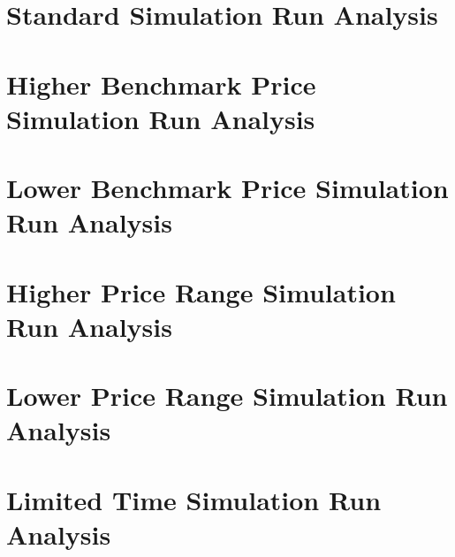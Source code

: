 \newpage
\section{Standard Simulation Run Analysis}
\label{sec:data:standard}


\newpage
\section{Higher Benchmark Price Simulation Run Analysis}
\label{sec:data:higher_benchmark}


\newpage
\section{Lower Benchmark Price Simulation Run Analysis}
\label{sec:data:lower_benchmark}


\newpage
\section{Higher Price Range Simulation Run Analysis}
\label{sec:data:higher_range}


\newpage
\section{Lower Price Range Simulation Run Analysis}
\label{sec:data:lower_range}


\newpage
\section{Limited Time Simulation Run Analysis}
\label{sec:data:limited_time}

